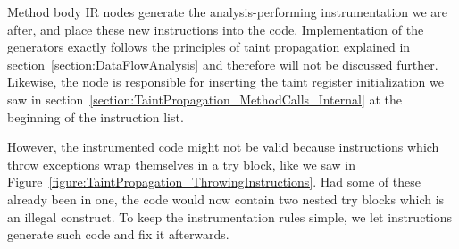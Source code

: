 \documentclass[12pt,twoside,notitlepage]{report}
\newcommand{\asm}[1] {\texttt{#1}}
\begin{document}
Method body IR nodes generate the analysis-performing instrumentation we are after, and place these new instructions into the code. Implementation of the generators exactly follows the principles of taint propagation explained in section~\ref{section:DataFlowAnalysis} and therefore will not be discussed further. Likewise, the node is responsible for inserting the taint register initialization we saw in section~\ref{section:TaintPropagation_MethodCalls_Internal} at the beginning of the instruction list.

However, the instrumented code might not be valid because instructions which throw exceptions wrap themselves in a try block, like we saw in Figure~\ref{figure:TaintPropagation_ThrowingInstructions}. Had some of these already been in one, the code would now contain two nested try blocks which is an illegal construct. To keep the instrumentation rules simple, we let instructions generate such code and fix it afterwards.

\end{document}
